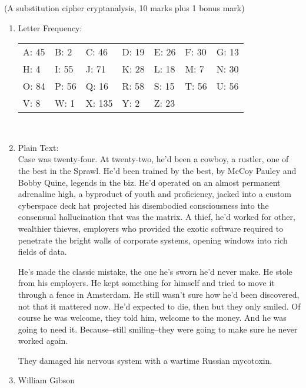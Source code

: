 \documentclass{assignment}
\begin{document}
\begin{problemlist}
\pbitem (A substitution cipher cryptanalysis, 10 marks plus 1 bonus mark)
\begin{problem}
	\begin{answer}
		\begin{enumerate}[label=(\alph*)]
		\item Letter Frequency: \\
		\begin{tabular}{ l l l l l l l }
  			A: 45 & B: 2 & C: 46 & D: 19 & E: 26 & F: 30 & G: 13\\
  			H: 4 & I: 55 & J: 71 & K: 28 & L: 18 & M: 7 & N: 30\\
  			O: 84 & P: 56 & Q: 16 & R: 58 & S: 15 & T: 56 & U: 56\\
  			V: 8 & W: 1 & X: 135 & Y: 2 & Z: 23
		\end{tabular}
		\\
		\item Plain Text: \\
		Case was twenty-four. At twenty-two, he'd been a cowboy, a rustler, one of the best in the Sprawl. He'd been trained by the best, by McCoy Pauley and Bobby Quine, legends in the biz. He'd operated on an almost permanent adrenaline high, a byproduct of youth and proficiency, jacked into a custom cyberspace deck hat projected his disembodied consciousness into the consensual hallucination that was the matrix. A thief, he'd worked for other, wealthier thieves, employers who provided the exotic software required to penetrate the bright walls of corporate systems, opening windows into rich fields of data.

He's made the classic mistake, the one he's sworn he'd never make. He stole from his employers. He kept something for himself and tried to move it through a fence in Amsterdam. He still wasn't sure how he'd been discovered, not that it mattered now. He'd expected to die, then but they only smiled. Of course he was welcome, they told him, welcome to the money. And he was going to need it. Because--still smiling--they were going to make sure he never worked again.

They damaged his nervous system with a wartime Russian mycotoxin. \\
	
		\item William Gibson 

		\end{enumerate}
		
	\end{answer}
\end{problem}


\end{problemlist}
\end{document}
